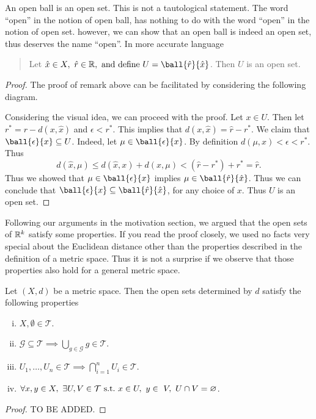 \begin{remark}
	An open ball is an open set. This is not a tautological statement. The word ``open'' in the notion of open ball, has nothing to do with the word ``open'' in the notion of open set. however, we can show that an open ball is indeed an open set, thus deserves the name ``open''. In more accurate language 
	\begin{quote}
		Let $\hat{x}\in X,\ \hat{r}\in\R,\ \text{and define } U=\ball{\hat{r}}{\hat{x}}$. Then $U$ is an open set.
	\end{quote}
\end{remark}
\begin{proof}
	The proof of remark above can be facilitated by considering the following diagram.

	
	
	Considering the visual idea, we can proceed with the proof. Let $x\in U$. Then let $r^* = r - d(x,\hat{x})$ and $\epsilon < r^*$. This implies that $d(x,\hat{x})=\hat{r}-r^*$. We claim that $\ball{\epsilon}{x} \subseteq U$. Indeed, let $\mu \in \ball{\epsilon}{x} $. By definition $d(\mu,x)<\epsilon<r^*$. Thus
	\[ d(\hat{x},\mu) \leq d(\hat{x},x) + d(x,\mu) < (\hat{r}-r^*) + r^* = \hat{r}. \]
	Thus we showed that $\mu \in \ball{\epsilon}{x}$ implies $\mu \in \ball{\hat{r}}{\hat{x}}$. Thus we can conclude that $\ball{\epsilon}{x} \subseteq \ball{\hat{r}}{\hat{x}}$, for any choice of $x$. Thus $U$ is an open set. 
\end{proof}

Following our arguments in the motivation section, we argued that the open sets of $\mathbb{R}^k$ satisfy some properties. If you read the proof closely, we used no facts very special about the Euclidean distance other than the properties described in the definition of a metric space. Thus it is not a surprise if we observe that those properties also hold for a general metric space. 

\begin{propbox}
	Let $(X,d)$ be a metric space. Then the open sets determined by $d$ satisfy the following properties
	\begin{enumerate}[(i)]
		\item $X,\emptyset \in \mathcal{T}$.
		\item $\mathcal{G}\subseteq \mathcal{T} \implies \bigcup_{g\in\mathcal{G}} g \in \mathcal{T}$.
		\item $U_1,\hdots,U_n \in \mathcal{T} \implies \bigcap_{i=1}^{n}U_i \in \mathcal{T}$.
		\item $\forall x,y\in X,\ \exists U,V \in \mathcal{T} \ \text{s.t.}\  x\in U,\ y\in\ V,\ U\cap V = \varnothing$.
	\end{enumerate}
\end{propbox}
\begin{proof}
	TO BE ADDED.
\end{proof}


